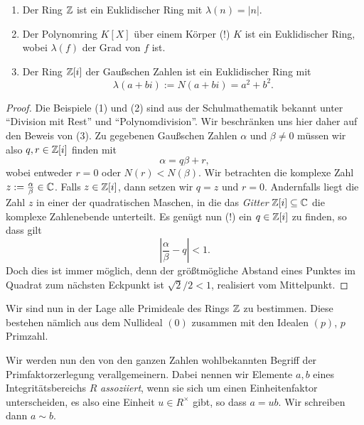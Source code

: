 \documentclass{book}
\begin{document}
\begin{prop}
    \label{prop:euklid}
    \begin{enumerate}
        \item {}Der Ring $\mathbb{Z}$ ist ein Euklidischer Ring mit $\lambda(n) = |n|$.
        \item {}Der Polynomring $K[X]$ über einem Körper (!) $K$ ist ein
            Euklidischer Ring, wobei $\lambda(f)$ der Grad von $f$ ist. 
        \item {}Der Ring $\mathbb{Z}[i]$ der Gaußschen Zahlen ist ein Euklidischer Ring mit
            \[
                \lambda(a + bi) := N(a+bi) = a^2 + b^2.
            \]
    \end{enumerate}
\end{prop}
\begin{proof}
    Die Beispiele (1) und (2) sind aus der Schulmathematik bekannt unter
    ``Division mit Rest'' und ``Polynomdivision''. Wir beschränken uns hier
    daher auf den Beweis von (3). Zu gegebenen Gaußschen Zahlen $\alpha$ und
    $\beta \neq 0$ müssen wir also $q,r \in \mathbb{Z}[i]$ finden mit
    \[
        \alpha = q \beta + r,
    \]
    wobei entweder $r=0$ oder $N(r) < N(\beta)$. Wir betrachten die komplexe
    Zahl $z := \frac{\alpha}{\beta} \in \mathbb{C}$. Falls $z \in
    \mathbb{Z}[i]$, dann setzen wir $q = z$ und $r = 0$.
    Andernfalls liegt die Zahl $z$ in einer der quadratischen Maschen, in die
    das \emph{Gitter} $\mathbb{Z}[i] \subseteq \mathbb{C}$ die komplexe Zahlenebende
    unterteilt. Es genügt nun (!) ein $q \in \mathbb{Z}[i]$ zu finden, so dass gilt
    \begin{equation}
            \left|\frac{\alpha}{\beta} - q\right| < 1.
    \end{equation}
    Doch dies ist immer möglich, denn der größtmögliche Abstand eines Punktes
    im Quadrat zum nächsten Eckpunkt ist $\sqrt{2}/2 < 1$, realisiert vom Mittelpunkt. 
\end{proof}

\begin{exa}
    \label{exa:integers}
    Wir sind nun in der Lage alle Primideale des Rings $\mathbb{Z}$ zu bestimmen.
    Diese bestehen nämlich aus dem Nullideal $(0)$ zusammen mit den Idealen
    $(p)$, $p$ Primzahl. 
\end{exa}

Wir werden nun den von den ganzen Zahlen wohlbekannten Begriff der
Primfaktorzerlegung verallgemeinern. Dabei nennen wir Elemente $a,b$ eines
Integritätsbereichs $R$ \emph{assoziiert}, wenn sie sich um einen
Einheitenfaktor unterscheiden, es also eine Einheit $u \in R^{\times}$ gibt, so dass
$a = u b$. Wir schreiben dann $a \sim b$. 
\end{document}
